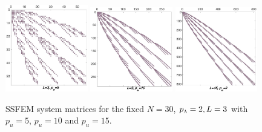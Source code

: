 \documentclass[letter,1p,11pt,oneside,onecolumn,sort&compress]{elsarticle}
\begin{document}
\begin{figure}[htbp]
\centering
 \includegraphics[width=0.32\textwidth,height=0.17\textheight]{plots/L3p5_n30.eps}
 \includegraphics[width=0.32\textwidth,height=0.17\textheight]{plots/L3p10_n30.eps}
 \includegraphics[width=0.32\textwidth,height=0.17\textheight]{plots/L3p15_n30.eps}
 \caption{SSFEM system matrices for the fixed $N=30$, $p_{\textsc{a}}=2, L=3$ with $p_{u}=5$, $p_{u}=10$ and $p_{u}=15$.}
 \label{fig:SFEM2}
\end{figure}
\end{document}
